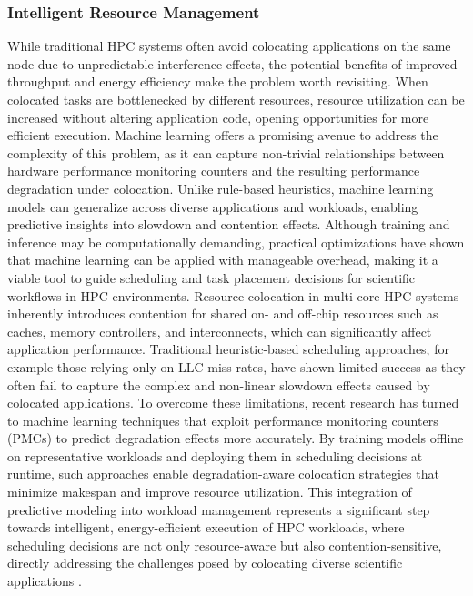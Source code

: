 \subsubsection{Intelligent Resource Management}
\label{sec:background_ml_resourcemanagement}
While traditional HPC systems often avoid colocating applications on the same node due to unpredictable interference effects, the potential benefits of improved throughput and energy efficiency make the problem worth revisiting. When colocated tasks are bottlenecked by different resources, resource utilization can be increased without altering application code, opening opportunities for more efficient execution. Machine learning offers a promising avenue to address the complexity of this problem, as it can capture non-trivial relationships between hardware performance monitoring counters and the resulting performance degradation under colocation. Unlike rule-based heuristics, machine learning models can generalize across diverse applications and workloads, enabling predictive insights into slowdown and contention effects. Although training and inference may be computationally demanding, practical optimizations have shown that machine learning can be applied with manageable overhead, making it a viable tool to guide scheduling and task placement decisions for scientific workflows in HPC environments. Resource colocation in multi-core HPC systems inherently introduces contention for shared on- and off-chip resources such as caches, memory controllers, and interconnects, which can significantly affect application performance. Traditional heuristic-based scheduling approaches, for example those relying only on LLC miss rates, have shown limited success as they often fail to capture the complex and non-linear slowdown effects caused by colocated applications. To overcome these limitations, recent research has turned to machine learning techniques that exploit performance monitoring counters (PMCs) to predict degradation effects more accurately. By training models offline on representative workloads and deploying them in scheduling decisions at runtime, such approaches enable degradation-aware colocation strategies that minimize makespan and improve resource utilization. This integration of predictive modeling into workload management represents a significant step towards intelligent, energy-efficient execution of HPC workloads, where scheduling decisions are not only resource-aware but also contention-sensitive, directly addressing the challenges posed by colocating diverse scientific applications \cite{ZACARIAS2021125}.

